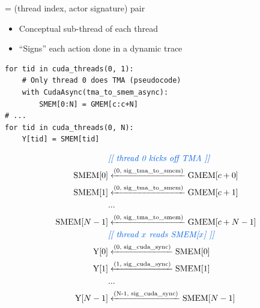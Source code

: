 \begin{minipage}[t]{0.48\textwidth}\fixminipage
{} = (thread index, actor signature) pair
\begin{itemize}
  \item Conceptual sub-thread of each thread
  \item ``Signs'' each action done in a dynamic trace
\end{itemize}
\vspace{2mm}
\begin{verbatim}
for tid in cuda_threads(0, 1):
    # Only thread 0 does TMA (pseudocode)
    with CudaAsync(tma_to_smem_async):
        SMEM[0:N] = GMEM[c:c+N]
# ...
for tid in cuda_threads(0, N):
    Y[tid] = SMEM[tid]
\end{verbatim}
\vspace{-4mm}
\begin{align*}
    & {\color{blueBoxFg}\textit{[[ thread 0 kicks off TMA ]]}} \\
    \text{SMEM[$0$]} & \xleftarrow{\text{(0, sig\_tma\_to\_smem)}} \text{GMEM[$c+0$]} \\
    \text{SMEM[$1$]} & \xleftarrow{\text{(0, sig\_tma\_to\_smem)}} \text{GMEM[$c+1$]} \\
    & ... \\
    \text{SMEM[$N-1$]} & \xleftarrow{\text{(0, sig\_tma\_to\_smem)}} \text{GMEM[$c+N-1$]} \\
    & {\color{blueBoxFg}\textit{[[ thread $x$ reads SMEM[$x$] ]]}} \\
    \text{Y[$0$]} & \xleftarrow{\text{(0, sig\_cuda\_sync)}} \text{SMEM[$0$]} \\
    \text{Y[$1$]} & \xleftarrow{\text{(1, sig\_cuda\_sync)}} \text{SMEM[$1$]} \\
    & ... \\
    \text{Y[$N-1$]} & \xleftarrow{\text{(N-1, sig\_cuda\_sync)}} \text{SMEM[$N-1$]} \\
\end{align*}
\end{minipage}
\newpage
{}

